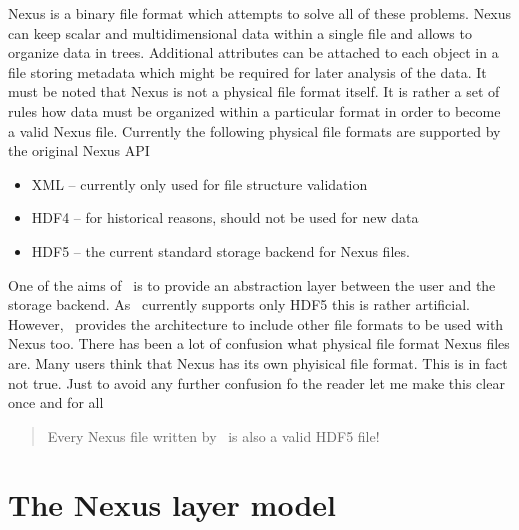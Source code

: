 Nexus is a binary file format which attempts to solve all of these problems.
Nexus can keep scalar and multidimensional data within a single file and allows
to organize data in trees. Additional attributes can be attached to each object
in a file storing metadata which might be required for later analysis of the
data. It must be noted that Nexus is not a physical file format itself. It is
rather a set of rules how data must be organized within a particular format in
order to become a valid Nexus file. Currently the following physical file
formats are supported by the original Nexus API
\begin{itemize}
\item XML -- currently only used for file structure validation
\item HDF4 -- for historical reasons, should not be used for new data
\item HDF5 -- the current standard storage backend for Nexus files. 
\end{itemize}
One of the aims of \libpniio\ is to provide an abstraction layer between the
user and the storage backend. As \libpniio\ currently supports only HDF5 this is
rather artificial. However, \libpniio\ provides the architecture to include
other file formats to be used with Nexus too. 
There has been a lot of confusion what physical file format Nexus files are.
Many users think that Nexus has its own phyisical file format. This is in fact
not true. Just to avoid any further confusion fo the reader let me make this
clear once and for all
\begin{quote}
{\huge
{\color{red}Every Nexus file written by \libpniio\ is also a valid HDF5 file!}
}
\end{quote}

\section{The Nexus layer model}


